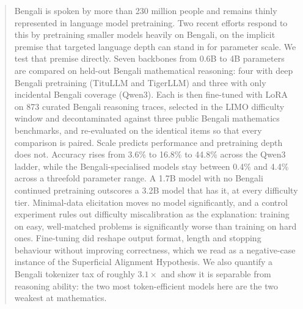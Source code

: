 %
%
%


\begin{abstract}
Bengali is spoken by more than 230 million people and remains thinly
represented in language model pretraining. Two recent efforts respond to this
by pretraining smaller models heavily on Bengali, on the implicit premise that
targeted language depth can stand in for parameter scale. We test that premise
directly. Seven backbones from 0.6B to 4B parameters are compared on held-out
Bengali mathematical reasoning: four with deep Bengali pretraining (TituLLM and
TigerLLM) and three with only incidental Bengali coverage (Qwen3). Each is then
fine-tuned with LoRA on 873 curated Bengali reasoning traces, selected in the
LIMO difficulty window and decontaminated against three public Bengali
mathematics benchmarks, and re-evaluated on the identical items so that every
comparison is paired. Scale predicts performance and pretraining depth does
not. Accuracy rises from 3.6\% to 16.8\% to 44.8\% across the Qwen3 ladder,
while the Bengali-specialised models stay between 0.4\% and 4.4\% across a
threefold parameter range. A 1.7B model with no Bengali continued pretraining
outscores a 3.2B model that has it, at every difficulty tier. Minimal-data
elicitation moves no model significantly, and a control experiment rules out
difficulty miscalibration as the explanation: training on easy, well-matched
problems is significantly worse than training on hard ones. Fine-tuning did
reshape output format, length and stopping behaviour without improving
correctness, which we read as a negative-case instance of the Superficial
Alignment Hypothesis. We also quantify a Bengali tokenizer tax of roughly
$3.1\times$ and show it is separable from reasoning ability: the two most
token-efficient models here are the two weakest at mathematics.
\end{abstract}


